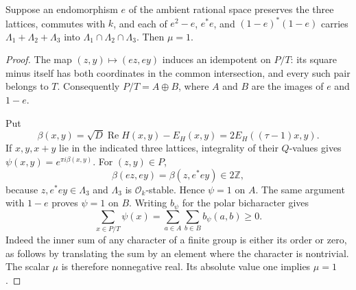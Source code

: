 \begin{lemma}\label{te-positive-gauss}
Suppose an endomorphism $e$ of the ambient rational space
preserves the three lattices, commutes with $k$, and
each of $e^2-e$, $e^*e$, and $(1-e)^*(1-e)$ carries
$\Lambda_1+\Lambda_2+\Lambda_3$ into
$\Lambda_1\cap\Lambda_2\cap\Lambda_3$.
Then $\mu=1$.
\end{lemma}
\begin{proof}
The map $(z,y)\mapsto(ez,ey)$ induces an idempotent on
$P/T$: its square minus itself has both coordinates in
the common intersection, and every such pair belongs
to $T$.  Consequently
$P/T=A\oplus B$, where $A$ and $B$ are the images of
$e$ and $1-e$.

Put
\[
 \beta(x,y)=\sqrt D\operatorname{Re}H(x,y)-E_H(x,y)
                         =2E_H((\tau-1)x,y).
 \tag{TE8}
\]
If $x,y,x+y$ lie in the indicated three lattices,
integrality of their $Q$-values gives
$\psi(x,y)=e^{\pi i\beta(x,y)}$.
For $(z,y)\in P$,
\[
       \beta(ez,ey)=\beta(z,e^*ey)\in2\mathbb Z,
\]
because $z,e^*ey\in\Lambda_3$ and $\Lambda_3$ is
$\mathcal O_k$-stable.  Hence $\psi=1$ on $A$.
The same argument with $1-e$ proves $\psi=1$ on $B$.
Writing $b_\psi$ for the polar bicharacter gives
\[
       \sum_{x\in P/T}\psi(x)
                    =\sum_{a\in A}\sum_{b\in B}b_\psi(a,b)\geq0.
 \tag{TE9}
\]
Indeed the inner sum of any character of a finite group
is either its order or zero, as follows by translating
the sum by an element where the character is nontrivial.
The scalar $\mu$ is therefore nonnegative real.  Its
absolute value one implies $\mu=1$.
\end{proof}


